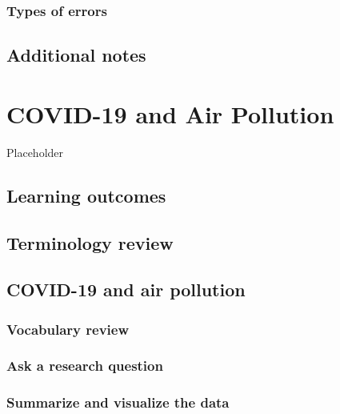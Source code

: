 \documentclass[
]{report}
\begin{document}
\hypertarget{types-of-errors}{%
\subsection{Types of errors}\label{types-of-errors}}

\hypertarget{additional-notes}{%
\section{Additional notes}\label{additional-notes}}

\hypertarget{covid-19-and-air-pollution}{%
\chapter{COVID-19 and Air Pollution}\label{covid-19-and-air-pollution}}

Placeholder

\hypertarget{learning-outcomes}{%
\section{Learning outcomes}\label{learning-outcomes}}

\hypertarget{terminology-review}{%
\section{Terminology review}\label{terminology-review}}

\hypertarget{covid-19-and-air-pollution-1}{%
\section{COVID-19 and air pollution}\label{covid-19-and-air-pollution-1}}

\hypertarget{vocabulary-review}{%
\subsection{Vocabulary review}\label{vocabulary-review}}

\hypertarget{ask-a-research-question}{%
\subsection{Ask a research question}\label{ask-a-research-question}}

\hypertarget{summarize-and-visualize-the-data}{%
\subsection{Summarize and visualize the data}\label{summarize-and-visualize-the-data}}
\end{document}
